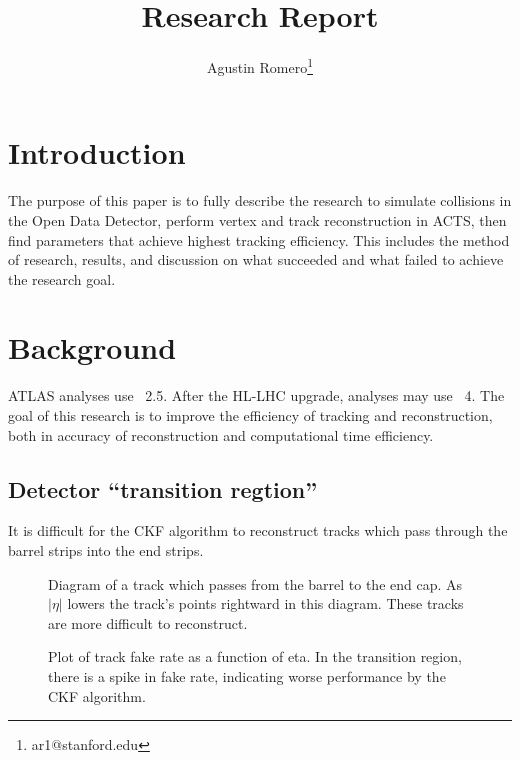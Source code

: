 \documentclass{article}
\title{Research Report}
\author{Agustin Romero\thanks{ar1@stanford.edu}}
\newcommand{\pic}[2]{\beg{center}{\texttt{[image: \#2]}}}
\newcommand{\figpic}[3]{
\begin{figure}[H]
\begin{center}
\pic{#1}{#2}
\caption{#3}
\end{center}
\end{figure}}
\begin{document}
\maketitle
\section{Introduction}
The purpose of this paper is to fully describe the research to simulate \ttbar collisions in the Open Data Detector, perform vertex and track reconstruction in ACTS, then find parameters that achieve highest tracking efficiency. This includes the method of research, results, and discussion on what succeeded and what failed to achieve the research goal.
\section{Background}
ATLAS analyses use \abseta~2.5. After the HL-LHC upgrade, analyses may use \abseta~4. The goal of this research is to improve the efficiency of tracking and reconstruction, both in accuracy of reconstruction and computational time efficiency.
\subsection{Detector ``transition regtion''}
It is difficult for the CKF algorithm to reconstruct tracks which pass through the barrel strips into the end strips.
\figpic{5cm}{2.png}{Diagram of a track which passes from the barrel to the end cap. As $|\eta|$ lowers the track's points rightward in this diagram. These tracks are more difficult to reconstruct.}
\figpic{5cm}{3.png}{Plot of track fake rate as a function of eta. In the transition region, there is a spike in fake rate, indicating worse performance by the CKF algorithm.}
\end{document}
